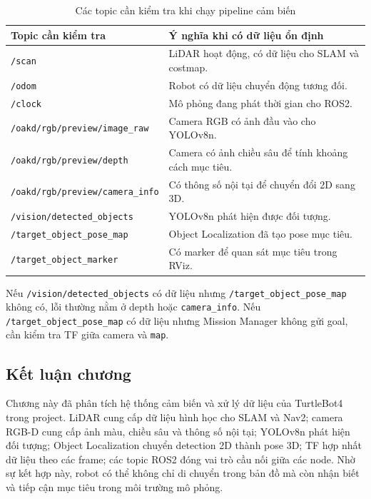 \begin{table}[H]
    \centering
    \caption{Các topic cần kiểm tra khi chạy pipeline cảm biến}
    \label{tab:sensor-check-topics}
    \renewcommand{\arraystretch}{1.25}
    \small
    \begin{tabularx}{\textwidth}{|>{\raggedright\arraybackslash}p{}|>{\raggedright\arraybackslash}X|}
        \hline
        \textbf{Topic cần kiểm tra} & \textbf{Ý nghĩa khi có dữ liệu ổn định} \\
        \hline
        \texttt{/scan} & LiDAR hoạt động, có dữ liệu cho SLAM và costmap. \\
        \hline
        \texttt{/odom} & Robot có dữ liệu chuyển động tương đối. \\
        \hline
        \texttt{/clock} & Mô phỏng đang phát thời gian cho ROS2. \\
        \hline
        \texttt{/oakd/rgb/preview/image\_raw} & Camera RGB có ảnh đầu vào cho YOLOv8n. \\
        \hline
        \texttt{/oakd/rgb/preview/depth} & Camera có ảnh chiều sâu để tính khoảng cách mục tiêu. \\
        \hline
        \texttt{/oakd/rgb/preview/camera\_info} & Có thông số nội tại để chuyển đổi 2D sang 3D. \\
        \hline
        \texttt{/vision/detected\_objects} & YOLOv8n phát hiện được đối tượng. \\
        \hline
        \texttt{/target\_object\_pose\_map} & Object Localization đã tạo pose mục tiêu. \\
        \hline
        \texttt{/target\_object\_marker} & Có marker để quan sát mục tiêu trong RViz. \\
        \hline
    \end{tabularx}
\end{table}

Nếu \texttt{/vision/detected\_objects} có dữ liệu nhưng \texttt{/target\_object\_pose\_map} không có, lỗi thường nằm ở depth hoặc \texttt{camera\_info}. Nếu \texttt{/target\_object\_pose\_map} có dữ liệu nhưng Mission Manager không gửi goal, cần kiểm tra TF giữa camera và \texttt{map}.

\subsection{Kết luận chương}
\label{subsec:sensor-conclusion}

Chương này đã phân tích hệ thống cảm biến và xử lý dữ liệu của TurtleBot4 trong project. LiDAR cung cấp dữ liệu hình học cho SLAM và Nav2; camera RGB-D cung cấp ảnh màu, chiều sâu và thông số nội tại; YOLOv8n phát hiện đối tượng; Object Localization chuyển detection 2D thành pose 3D; TF hợp nhất dữ liệu theo các frame; các topic ROS2 đóng vai trò cầu nối giữa các node. Nhờ sự kết hợp này, robot có thể không chỉ di chuyển trong bản đồ mà còn nhận biết và tiếp cận mục tiêu trong môi trường mô phỏng.